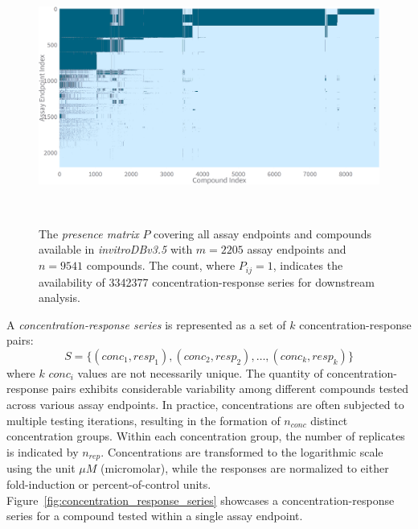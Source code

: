 \begin{figure}[h]  %
    \centering
    \includegraphics[width=1.0\textwidth]{figures/presence_matrix_all.png}  
    \caption{The \emph{presence matrix} $P$ covering all assay endpoints and compounds available in \textit{invitroDBv3.5} with $m = \num{2205}$ assay endpoints and $n = \num{9541}$ compounds. The count, where $P_{ij} = 1$, indicates the availability of \num{3342377} concentration-response series for downstream analysis.}
~\label{fig:presence_matrix_all} 
\end{figure}


A \textit{concentration-response series} is represented as a set of $k$ concentration-response pairs: 
\[ S = \{(conc_1, resp_1), (conc_2, resp_2), \dots, (conc_k, resp_k)\} \]
where $k$ $conc_i$ values are not necessarily unique. The quantity of concentration-response pairs exhibits considerable variability among different compounds tested across various assay endpoints.
In practice, concentrations are often subjected to multiple testing iterations, resulting in the formation of $n_{conc}$ distinct concentration groups. Within each concentration group, the number of replicates is indicated by $n_{rep}$.
Concentrations are transformed to the logarithmic scale using the unit $\mu M$ (micromolar), while the responses are normalized to either fold-induction or percent-of-control units.
Figure~\ref{fig:concentration_response_series} showcases a concentration-response series for a compound tested within a single assay endpoint.


